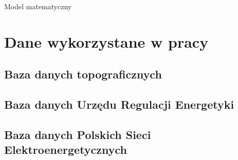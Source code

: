 Model matematyczny \cite{mod-agentowe}

\section{Dane wykorzystane w pracy}

\subsection{Baza danych topograficznych}

\subsection{Baza danych Urzędu Regulacji Energetyki}

\subsection{Baza danych Polskich Sieci Elektroenergetycznych}


\section{}